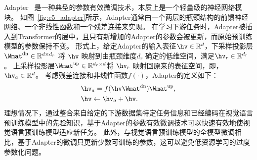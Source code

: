 \label{sec:revist}

Adapter~\cite{houlsby2019parameter} 是一种典型的参数有效微调技术，本质上是一个轻量级的神经网络模块。
如图~\ref{fig:c5_adapter}所示，Adapter通常由一个两层的瓶颈结构的前馈神经网络、一个非线性函数和一个残差连接来实现。
在学习下游任务时，Adapter被插入到Transformer的层中，且只有新增加的Adapter的参数会被更新，而原始预训练模型的参数保持不变。
形式上，给定Adapter的输入表征$\hv \in \mathbb{R}^d$，下采样投影层 $\Wmat^{\text{dn}} \in \mathbb{R}^{d \times d_r}$ 将 $\hv$ 映射到由瓶颈维度$d_r$ 确定的低维空间，满足$\hv_r \in \mathbb{R}^{d_r}$。
上采样投影层$\Wmat^{\text{up}} \in \mathbb{R}^{d_r \times d}$将 $\hv_r$ 映射回原来的表征空间，即，$\hv_a \in \mathbb{R}^d$。
考虑残差连接和非线性函数$f(\cdot)$，Adapter的定义如下：
\begin{align} 
&\hv_a = f(\hv \Wmat^{\text{dn}}) \Wmat^{\text{up}}, \\
&\hv \leftarrow \hv_a + \hv. 
\label{eq:adapter} 
\end{align}
理想情况下，通过整合来自给定的下游数据集特定任务信息和已经编码在视觉语言预训练模型中的先验知识，基于Adapter的参数有效微调技术可以快速有效地使视觉语言预训练模型适应新任务。
此外，与视觉语言预训练模型的全模型微调相比，基于Adapter的微调只更新少数可训练的参数，这可以避免低资源学习的过度参数化问题。




